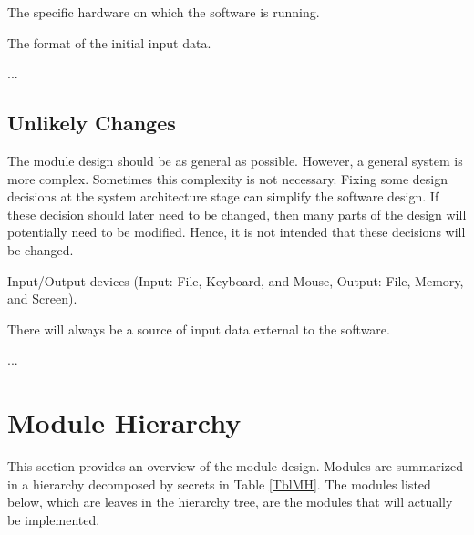 \documentclass[12pt, titlepage]{article}
\newcounter{acnum}
\newcommand{\actheacnum}{AC\theacnum}
\newcounter{ucnum}
\newcommand{\uctheucnum}{UC\theucnum}
\begin{document}
\begin{description}
\item[ \actheacnum \label{acHardware}:] The specific
  hardware on which the software is running.
\item[ \actheacnum \label{acInput}:] The format of the
  initial input data.
\item ...
\end{description}

\subsection{Unlikely Changes} \label{SecUchange}

The module design should be as general as possible. However, a general system is
more complex. Sometimes this complexity is not necessary. Fixing some design
decisions at the system architecture stage can simplify the software design. If
these decision should later need to be changed, then many parts of the design
will potentially need to be modified. Hence, it is not intended that these
decisions will be changed.

\begin{description}
\item[ \uctheucnum \label{ucIO}:] Input/Output devices
  (Input: File, Keyboard, and Mouse, Output: File, Memory, and Screen).
\item[ \uctheucnum \label{ucInput}:] There will always be
  a source of input data external to the software.
\item ...
\end{description}

\section{Module Hierarchy} \label{SecMH}

This section provides an overview of the module design. Modules are summarized
in a hierarchy decomposed by secrets in Table \ref{TblMH}. The modules listed
below, which are leaves in the hierarchy tree, are the modules that will
actually be implemented.
\end{document}
